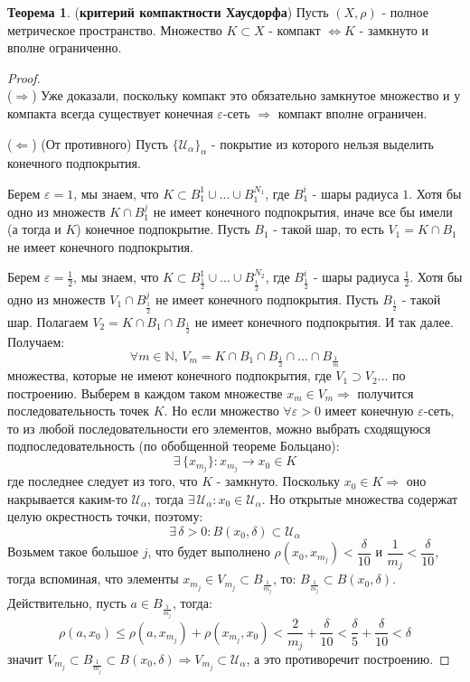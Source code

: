 \documentclass[12pt]{article}
\newcommand{\MN}{\mathbb{N}}
\newcommand{\MU}{\mathcal{U}}
\newcommand{\VE}{\varepsilon}
\theoremstyle{definition}
\newtheorem{theorem}{Теорема}
\begin{document}
\begin{theorem}(\textbf{критерий компактности Хаусдорфа})
	Пусть $(X,\rho)$ - полное метрическое пространство. Множество $K \subset X$ - компакт $\Leftrightarrow K$ - замкнуто и вполне ограниченно.
\end{theorem}
\begin{proof}\hfill\\
	($\Rightarrow$) Уже доказали, поскольку компакт это обязательно замкнутое множество и у компакта всегда существует конечная $\VE$-сеть $\Rightarrow$ компакт вполне ограничен.
	
	($\Leftarrow$) (От противного) Пусть $\{\MU_\alpha\}_\alpha$ - покрытие из которого нельзя выделить конечного подпокрытия. 
	
	Берем $\VE = 1$, мы знаем, что $K \subset B_1^1 \cup \dotsc \cup B_1^{N_1}$, где $B_1^i$ - шары радиуса $1$. Хотя бы одно из множеств $K \cap B_1^j$ не имеет конечного подпокрытия, иначе все бы имели (а тогда и $K$) конечное подпокрытие. Пусть $B_1$ - такой шар, то есть $V_1 = K \cap B_1$ не имеет конечного подпокрытия.
	
	Берем $\VE = \frac{1}{2}$, мы знаем, что $K \subset B_{\frac{1}{2}}^1 \cup \dotsc \cup B_{\frac{1}{2}}^{N_2}$, где $B_{\frac{1}{2}}^i$ - шары радиуса $\tfrac{1}{2}$. Хотя бы одно из множеств $V_1 \cap B_{\frac{1}{2}}^j$ не имеет конечного подпокрытия. Пусть $B_{\frac{1}{2}}$ - такой шар. Полагаем $V_2 = K \cap B_1 \cap B_{\frac{1}{2}}$ не имеет конечного подпокрытия. И так далее. Получаем: 
	$$
		\forall m \in \MN, \, V_m = K \cap B_1 \cap B_{\frac{1}{2}} \cap \dotsc \cap B_{\frac{1}{m}}
	$$ 
	множества, которые не имеют конечного подпокрытия, где $V_1 \supset V_2 \dotsc $ по построению. Выберем в каждом таком множестве $x_m \in V_m \Rightarrow$ получится последовательность точек $K$. Но если множество $\forall \VE > 0$ имеет конечную $\VE$-сеть, то из любой последовательности его элементов, можно выбрать сходящуюся подпоследовательность (по обобщенной теореме Больцано):
	$$
		\exists \, \{x_{m_j}\} \colon x_{m_j} \to x_0 \in K
	$$
	где последнее следует из того, что $K$ - замкнуто. Поскольку $x_0 \in K \Rightarrow$ оно накрывается каким-то $\MU_\alpha$, тогда $\exists \, \MU_\alpha \colon x_0 \in \MU_\alpha$. Но открытые множества содержат целую окрестность точки, поэтому:
	$$
		\exists \, \delta > 0 \colon B(x_0, \delta) \subset \MU_\alpha
	$$
	Возьмем такое большое $j$, что будет выполнено $\rho(x_0, x_{m_j}) < \dfrac{\delta}{10}$ и $\dfrac{1}{m_j} < \dfrac{\delta}{10}$, тогда вспоминая, что элементы $x_{m_j} \in V_{m_j} \subset B_{\frac{1}{m_j}}$, то: $B_{\frac{1}{m_j}} \subset B(x_0, \delta)$. Действительно, пусть $a \in B_{\frac{1}{m_j}}$, тогда:
	$$
		\rho(a,x_0) \leq \rho(a,x_{m_j}) + \rho(x_{m_j},x_0) < \dfrac{2}{m_j} + \dfrac{\delta}{10} < \dfrac{\delta}{5} + \dfrac{\delta}{10} < \delta
	$$
	значит $V_{m_j}  \subset B_{\frac{1}{m_j}} \subset B(x_0, \delta) \Rightarrow V_{m_j} \subset \MU_\alpha$, а это противоречит  построению.
\end{proof}
\end{document}
